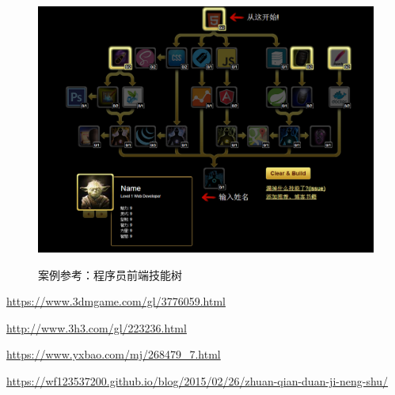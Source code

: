 \documentclass{article}  %
\begin{document}
\begin{figure}
\centering 
\includegraphics[width=1\textwidth]{feSkill} 
\caption{案例参考：程序员前端技能树} 
\label{feSkill} 
\cite{feSkill}
\end{figure}

\begin{thebibliography}{9}

\url{https://www.3dmgame.com/gl/3776059.html}

\url{http://www.3h3.com/gl/223236.html}

\url{https://www.yxbao.com/mj/268479_7.html}

\url{https://wf123537200.github.io/blog/2015/02/26/zhuan-qian-duan-ji-neng-shu/}
\end{thebibliography}
\end{document}
